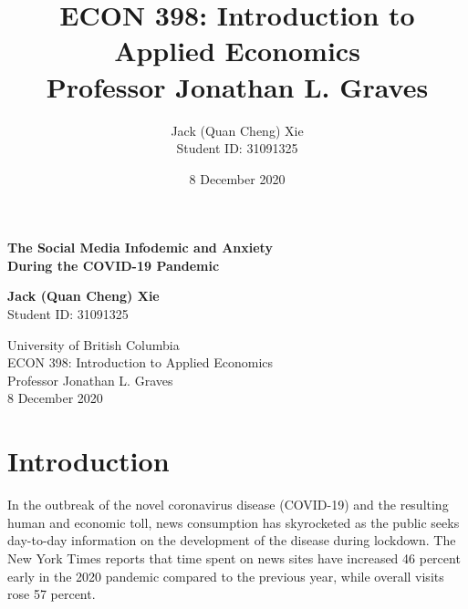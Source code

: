 \documentclass{article}[12pt]
\title{ECON 398: Introduction to Applied Economics\\Professor Jonathan L. Graves}
\author{Jack (Quan Cheng) Xie \\Student ID: 31091325}
\date{8 December 2020}
\begin{document}
    \begin{titlepage}
       \begin{center}
            \vspace*{5cm}
          
            \LARGE
            \textbf{The Social Media Infodemic and Anxiety \\During the COVID-19 Pandemic}
            
           \vspace{3.5cm}
    
            \Large
            \textbf{Jack (Quan Cheng) Xie} \\
            Student ID: 31091325
                
            \vspace{3.5cm}
         
            University of British Columbia \\
            ECON 398: Introduction to Applied Economics \\
            Professor Jonathan L. Graves \\
            8 December 2020
        \end{center}
    \end{titlepage}
    
    
    \section{Introduction}
    
        
        In the outbreak of the novel coronavirus disease (COVID-19) and the resulting human and economic toll, news consumption has skyrocketed as the public seeks day-to-day information on the development of the disease during lockdown. The New York Times reports that time spent on news sites have increased 46 percent early in the 2020 pandemic compared to the previous year, while overall visits rose 57 percent.
        
\end{document}
